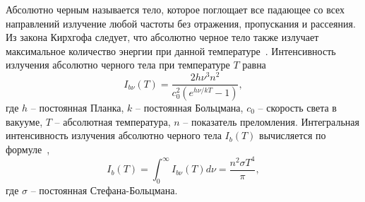 Абсолютно черным называется тело, которое поглощает все падающее
со всех направлений излучение любой частоты без отражения, пропускания и
рассеяния.
Из закона Кирхгофа следует, что абсолютно черное тело также излучает
максимальное количество энергии при данной
температуре~\cite[25]{Ozisik1976}\cite[5]{modest2013radiative}.
Интенсивность излучения абсолютно черного тела при температуре $T$ равна
\[
    I_{b\nu}(T) = \frac{2h \nu^3 n^2}{c^2_0(e^{h\nu/kT} - 1)},
\]
где $h$ -- постоянная Планка, $k$ -- постоянная Больцмана, $c_0$ -- скорость света в вакууме,
$T$ -- абсолютная температура, $n$ -- показатель преломления.
Интегральная интенсивность излучения абсолютно черного тела $I_b(T)$
вычисляется по формуле~\cite[28]{Ozisik1976},\cite[10]{modest2013radiative}
\[
    I_b(T) = \int^{\infty}_0 I_{b\nu}(T) d\nu = \frac{n^2 \sigma T^4}{\pi},
\]
где $\sigma$ -- постоянная Стефана-Больцмана.


